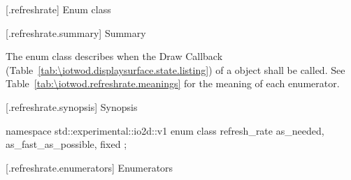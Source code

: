  [\iotwod.refreshrate] {Enum class }

 [\iotwod.refreshrate.summary] { Summary}

\pnum
The  enum class describes when the Draw Callback (Table~\ref{tab:\iotwod.displaysurface.state.listing}) of a  object shall be called. See Table~\ref{tab:\iotwod.refreshrate.meanings} for the meaning of each \tcode{} enumerator.

 [\iotwod.refreshrate.synopsis] { Synopsis}

\begin{codeblock}
namespace std::experimental::io2d::v1 {
  enum class refresh_rate {
    as_needed,
    as_fast_as_possible,
    fixed
  };
}
\end{codeblock}

 [\iotwod.refreshrate.enumerators] { Enumerators}

